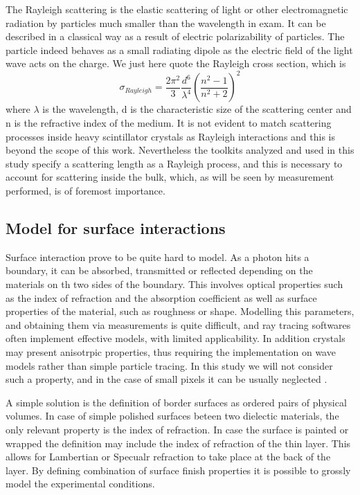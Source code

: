 The Rayleigh scattering is the elastic scattering of light or other electromagnetic radiation by particles much smaller than the wavelength in exam.
It can be described in a classical way as a result of electric polarizability of particles.
The particle indeed behaves as a small radiating dipole as the electric field of the light wave acts on the charge. We just here quote the Rayleigh cross section, which is 
\begin{equation}
\sigma _{Rayleigh} = \frac{2\pi ^{2}}{3} \frac{d^{6}}{\lambda ^{4}}\left( \frac{n^{2}-1}{n^{2}+2} \right) ^{2}
\end{equation}
where $\lambda$ is the wavelength, d is the characteristic size of the scattering center and n is the refractive index of the medium.
It is not evident to match scattering processes inside heavy scintillator crystals as Rayleigh interactions and this is beyond the scope of this work. Nevertheless the toolkits analyzed and used in this study specify a scattering length as a Rayleigh process, and this is necessary to account for scattering inside the bulk, which, as will be seen by measurement performed, is of foremost importance.

\subsection{Model for surface interactions}
Surface interaction prove to be quite hard to model. As a photon hits a boundary, it can be absorbed, transmitted or reflected depending on the  materials on th two sides of the boundary. This involves optical properties such as the index of refraction and the absorption coefficient as well as surface properties of the material, such as roughness or shape.
Modelling this parameters, and obtaining them via measurements is quite difficult, and ray tracing softwares often implement effective models, with limited applicability.
In addition crystals may present anisotrpic properties, thus requiring the implementation on wave models rather than simple particle tracing.
In this study we will not consider such a property, and in the case of small pixels it can be usually neglected \cite{Cuccia2013}.

A simple solution is the definition of border surfaces as ordered pairs of physical volumes. In case of simple polished surfaces beteen two dielectic materials, the only relevant property is the index of refraction.
In case the surface is painted or wrapped the definition may include the index of refraction of the thin layer. This allows for Lambertian or Specualr refraction to take place at the back of the layer. By defining combination of surface finish properties it is possible to grossly model the experimental conditions.

